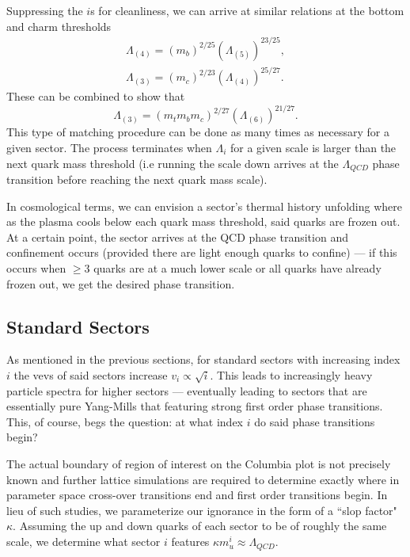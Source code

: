 \documentclass[nofootinbib,twocolumn,preprintnumbers]{revtex4-2}
\begin{document}
Suppressing the $i$s for cleanliness, we can arrive at similar relations at the bottom and charm thresholds
\begin{equation}
\begin{split}
\Lambda_{(4)} = (m_b)^{2/25}(\Lambda_{(5)})^{23/25},
\\
\Lambda_{(3)} = (m_c)^{2/23}(\Lambda_{(4)})^{25/27}.
\end{split}
\end{equation}
These can be combined to show that
\begin{equation}
\Lambda_{(3)} = (m_t m_b m_c)^{2/27}(\Lambda_{(6)})^{21/27}.
\end{equation}
This type of matching procedure can be done as many times as necessary for a given sector. The process terminates when $\Lambda_i$ for a given scale is larger than the next quark mass threshold (i.e running the scale down arrives at the $\Lambda_{QCD}$ phase transition before reaching the next quark mass scale).

In cosmological terms, we can envision a sector's thermal history unfolding where as the plasma cools below each quark mass threshold, said quarks are frozen out. At a certain point, the sector arrives at the QCD phase transition and confinement occurs (provided there are light enough quarks to confine) --- if this occurs when $\geq 3$ quarks are at a much lower scale or all quarks have already frozen out, we get the desired phase transition.   

\subsection{Standard Sectors}



As mentioned in the previous sections, for standard sectors with increasing index $i$ the vevs of said sectors increase $v_i\propto \sqrt{i}$. This leads to increasingly heavy particle spectra for higher sectors --- eventually leading to sectors that are essentially pure Yang-Mills that featuring strong first order phase transitions. This, of course, begs the question: at what index $i$ do said phase transitions begin?

The actual boundary of region of interest on the Columbia plot is not precisely known and further lattice simulations are required to determine exactly where in parameter space cross-over transitions end and first order transitions begin. In lieu of such studies, we parameterize our ignorance in the form of a ``slop factor" $\kappa$. Assuming the up and down quarks of each sector to be of roughly the same scale, we determine what sector $i$ features $\kappa m_u^i \approx \Lambda_{QCD}$.
\end{document}
